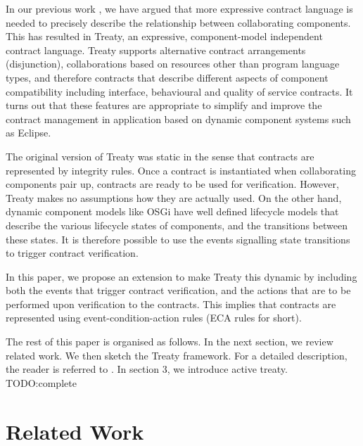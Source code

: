 \documentclass{llncs}
\begin{document}
In our previous work \cite{Treaty.JOT2009}, we have argued that more expressive contract language is needed to precisely describe the relationship between collaborating components. This has resulted in Treaty, an expressive, component-model independent contract language. Treaty supports alternative contract arrangements (disjunction), collaborations based on resources other than program language types, and therefore contracts that describe different aspects of component compatibility \cite{BeugnardEtAl99} including interface, behavioural and quality of service contracts. It turns out that these features are appropriate to simplify and improve the contract management in application based on dynamic component systems such as Eclipse. 

The original version of Treaty was static in the sense that contracts are represented by integrity rules. Once a contract is instantiated when collaborating components pair up, contracts are ready to be used for verification. However, Treaty makes no assumptions how they are actually used. On the other hand, dynamic component models like OSGi have well defined lifecycle models that describe the various lifecycle states of components, and the transitions between these states. It is therefore possible to use the events signalling state transitions to trigger contract verification. 

In this paper, we propose an extension to make Treaty this dynamic by including both the events that trigger contract verification, and the actions that are to be performed upon verification  to the contracts. This implies that contracts are represented using event-condition-action rules (ECA rules for short). 

The rest of this paper is organised as follows. In the next section, we review related work. We then sketch the Treaty framework. For a detailed description, the reader is referred to \cite{Treaty.JOT2009}. In section 3, we introduce active treaty. TODO:complete 



\section{Related Work}

\end{document}
